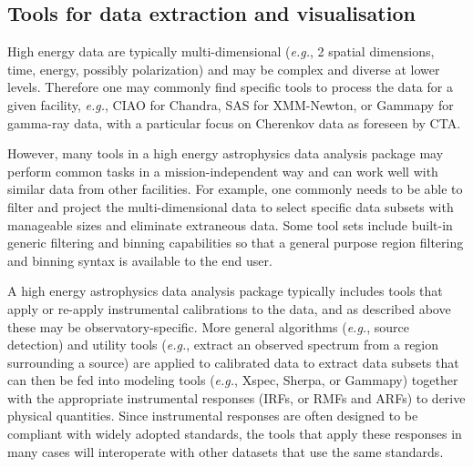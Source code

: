 \documentclass[11pt,a4paper]{ivoa}
\begin{document}
\subsection{Tools for data extraction and visualisation}
\label{sec:tools}

%
%
%
%


High energy data are typically multi-dimensional ({\em e.g.\/}, 2 spatial dimensions, time, energy, possibly polarization) and may be complex and diverse at lower levels.  Therefore one may commonly find specific tools to process the data for a given facility, {\em e.g.\/}, CIAO for Chandra, SAS for XMM-Newton, or Gammapy for gamma-ray data, with a particular focus on Cherenkov data as foreseen by CTA.

However, many tools in a high energy astrophysics data analysis package may perform common tasks in a mission-independent way and can work well with similar data from other facilities.  For example, one commonly needs to be able to filter and project the multi-dimensional data to select specific data subsets with manageable sizes and eliminate extraneous data.  Some tool sets include built-in generic filtering and binning capabilities so that a general purpose region filtering and binning syntax is available to the end user.

A high energy astrophysics data analysis package typically includes tools that apply or re-apply instrumental calibrations to the data, and as described above these may be observatory-specific.  More general algorithms ({\em e.g.\/}, source detection) and utility tools ({\em e.g.\/}, extract an observed spectrum from a region surrounding a source) are applied to calibrated data to extract data subsets that can then be fed into modeling tools ({\em e.g.\/}, Xspec, Sherpa, or Gammapy) together with the appropriate instrumental responses (IRFs, or RMFs and ARFs) to derive physical quantities.  Since instrumental responses are often designed to be compliant with widely adopted standards, the tools that apply these responses in many cases will interoperate with other datasets that use the same standards.
\end{document}
